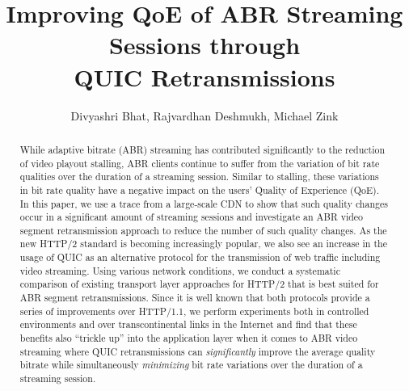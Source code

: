 \documentclass[sigconf]{acmart}
\begin{document}
\title{Improving QoE of ABR Streaming Sessions through\\ QUIC Retransmissions}
\author{
\hspace{50pt} 
Divyashri Bhat, Rajvardhan Deshmukh, Michael Zink
}




\begin{abstract}
While adaptive bitrate (ABR) streaming has contributed significantly to the reduction of video playout stalling, ABR clients continue to suffer from the variation of bit rate qualities over the duration of a streaming session. Similar to stalling, these variations in bit rate quality have a negative impact on the users' Quality of Experience (QoE).
In this paper, we use a trace from a large-scale CDN to show that such quality changes occur in a significant amount of streaming sessions and investigate an ABR video segment retransmission approach to reduce the number of such quality changes. As the new HTTP/2 standard is becoming increasingly popular, we also see an increase in the usage of QUIC as an alternative protocol for the transmission of web traffic including video streaming. Using various network conditions, we conduct a systematic comparison of existing transport layer approaches for HTTP/2 that is best suited for ABR segment retransmissions. Since it is well known that both protocols provide a series of improvements over HTTP/1.1, we perform experiments both in controlled environments and over transcontinental links in the Internet and find that these benefits also ``trickle up'' into the application layer when it comes to ABR video streaming where QUIC retransmissions can \textit{significantly} improve the average quality bitrate while simultaneously \textit{minimizing} bit rate variations over the duration of a streaming session.
\end{abstract}
\maketitle
\end{document}
